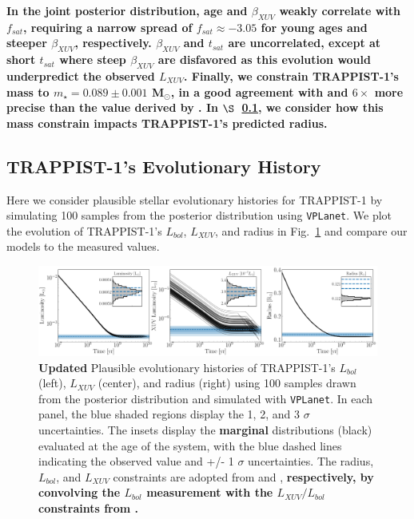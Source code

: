 \documentclass[twocolumn]{aastex62}
\newcommand{\xxx}[1]{{\textbf{#1}}}
\newcommand{\vplanet}[0]{\texttt{VPLanet}\xspace}
\begin{document}
\xxx{In the joint posterior distribution, age and $\beta_{XUV}$ weakly correlate with $f_{sat}$, requiring a narrow spread of $f_{sat} \approx -3.05$ for young ages and steeper $\beta_{XUV}$, respectively. $\beta_{XUV}$ and $t_{sat}$ are uncorrelated, except at short $t_{sat}$ where steep $\beta_{XUV}$ are disfavored as this evolution would underpredict the observed $L_{XUV}$. Finally, we constrain TRAPPIST-1's mass to $m_{\star} = 0.089 \pm{0.001}$ M$_{\odot}$, in a good agreement with and $6\times$ more precise than the value derived by \citet{vanGrootel2018}. In $\S$~\ref{sec:evol}, we consider how this mass constrain impacts TRAPPIST-1's predicted radius.}

\subsection{TRAPPIST-1's Evolutionary History} \label{sec:evol}

Here we consider plausible stellar evolutionary histories for TRAPPIST-1 by simulating 100 samples from the posterior distribution using \vplanet. We plot the evolution of TRAPPIST-1's $L_{bol}$, $L_{XUV}$, and radius in Fig.~\ref{fig:evol} and compare our models to the measured values. 

\begin{figure}[t]
	\includegraphics[width=\textwidth]{../Analysis/Evol/trappist1Evol.pdf}
   \caption{\xxx{Updated} Plausible evolutionary histories of TRAPPIST-1's $L_{bol}$ (left), $L_{XUV}$ (center), and radius (right) using 100 samples drawn from the posterior distribution and simulated with \vplanet. In each panel, the blue shaded regions display the 1, 2, and 3 $\sigma$ uncertainties. The insets display the \xxx{marginal} distributions (black) evaluated at the age of the system, with the blue dashed lines indicating the observed value and +/- 1 $\sigma$ uncertainties. The radius, $L_{bol}$, and $L_{XUV}$ constraints are adopted from \citet{vanGrootel2018} and \citet{Wheatley2017}, \xxx{respectively, by convolving the \citet{vanGrootel2018} $L_{bol}$ measurement with the $L_{XUV}/L_{bol}$ constraints from \citet{Wheatley2017}.}}%
    \label{fig:evol}%
\end{figure}
\end{document}
